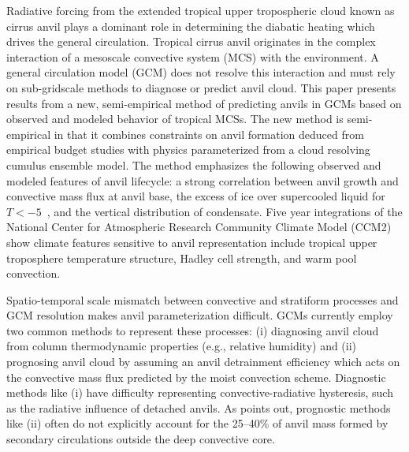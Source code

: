 \documentclass[twocolumn,twoside,final,10pt]{article}
\begin{document}
\label{sec:anv_intro}

Radiative forcing from the extended tropical upper tropospheric cloud
known as cirrus anvil plays a dominant role in determining
the diabatic heating which drives the general circulation. 
Tropical cirrus anvil originates in the complex interaction of a
mesoscale convective system (MCS) with the environment.
A general circulation model (GCM) does not resolve this interaction
and must rely on sub-gridscale methods to diagnose or predict anvil
cloud. 
This paper presents results from a new, semi-empirical method of
predicting anvils in GCMs based on observed and modeled behavior of
tropical MCSs.
The new method is semi-empirical in that it combines constraints on
anvil formation deduced from empirical budget studies with physics
parameterized from a cloud resolving cumulus ensemble model.
The method emphasizes the following observed and modeled features of
anvil lifecycle: a strong correlation between anvil growth and
convective mass flux at anvil base, the excess of ice over supercooled
liquid for $T < -5$~\dgrc, and the vertical distribution of
condensate.  
Five year integrations of the National Center for Atmospheric Research
Community Climate Model (CCM2) show climate features sensitive to
anvil representation include tropical upper troposphere temperature
structure, Hadley cell strength, and warm pool convection.

\label{sec:anv_mdl}


Spatio-temporal scale mismatch between convective and stratiform
processes and GCM resolution makes anvil parameterization difficult.
GCMs currently employ two common methods to represent these processes:
(i) diagnosing anvil cloud from column thermodynamic properties (e.g.,
relative humidity) and (ii) prognosing anvil cloud by assuming an
anvil detrainment efficiency which acts on the convective mass flux
predicted by the moist convection scheme.
Diagnostic methods like (i) have difficulty representing
convective-radiative hysteresis, such as the radiative influence of 
detached anvils.
As \cite{Don93} points out, prognostic methods like (ii) often do not
explicitly account for the 25--40\% of anvil mass formed by secondary
circulations outside the deep convective core.
\end{document}

